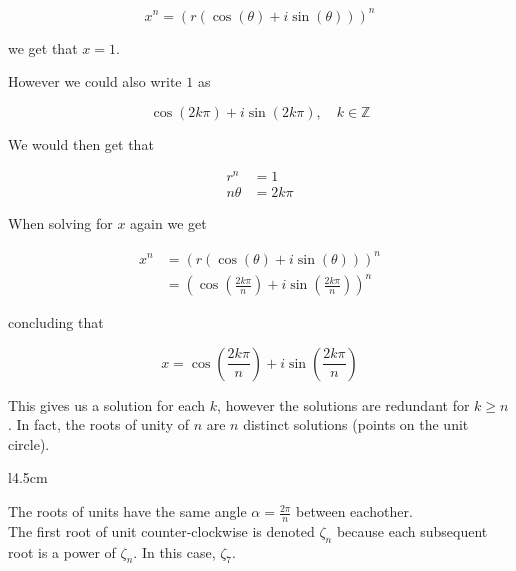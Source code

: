 \documentclass{article}
\begin{document}
\[
    x^n = \left(r\left(\cos(\theta) + i\sin(\theta)\right)\right)^n
\]

we get that \(x=1\).

However we could also write \(1\) as

\[
    \cos(2k\pi) + i\sin(2k\pi), \quad k\in \mathbb{Z}
\]

We would then get that

\begin{align*}
    r^n&=1 \\
    n\theta&=2k\pi
\end{align*}

When solving for \(x\) again we get

\begin{align*}
    x^n &= \left(r\left(\cos(\theta) + i\sin(\theta)\right)\right)^n
    \\
    &= \left(\cos\left(\frac{2k\pi}{n}\right) + i\sin\left(\frac{2k\pi}{n}\right)\right)^n
\end{align*}

concluding that

\[
    x = \cos\left(\frac{2k\pi}{n}\right) + i\sin\left(\frac{2k\pi}{n}\right)
\]

This gives us a solution for each \(k\), however the solutions are redundant for \(k \geq n\).
In fact, the roots of unity of \(n\) are \(n\) distinct solutions (points on the unit circle).

\def\n{7}
\begin{wrapfigure}[4]{l}{4.5cm} %
\end{wrapfigure}
    
The roots of units have the same angle \(\alpha = \frac{2\pi}{n}\) between eachother.
\\
The first root of unit counter-clockwise is denoted \(\zeta_n\) because each subsequent
root is a power of \(\zeta_n\). In this case, \(\zeta_\n\).
\end{document}
